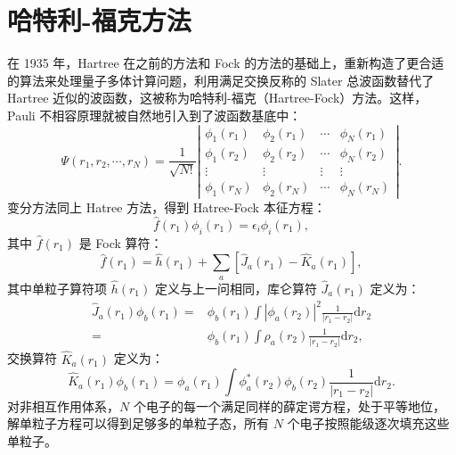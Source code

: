 \section{哈特利-福克方法}
在 1935 年，Hartree 在之前的方法和 Fock 的方法的基础上，重新构造了更合适的算法来处理量子多体计算问题，利用满足交换反称的 Slater 总波函数替代了 Hartree 近似的波函数，这被称为哈特利-福克（Hartree-Fock）方法\cite{Hartree1935}。这样， Pauli 不相容原理就被自然地引入到了波函数基底中：
\begin{equation}
\Psi(r_1,r_2,\cdots,r_N)=\frac{1}{\sqrt{N!}}
\left|
\begin{array}{ccccc} 
    \phi_1(r_1)  &  \phi_2(r_1)   & \cdots & \phi_N(r_1) \\ 
   \phi_1(r_2)  &  \phi_2(r_2)   & \cdots & \phi_N(r_2)\\ 
    \vdots  &  \vdots   &\vdots &\vdots\\
    \phi_1(r_N) &\phi_2(r_N)&\cdots&\phi_N(r_N)
\end{array}
\right| .
\end{equation}
变分方法同上 Hatree 方法，得到 Hatree-Fock 本征方程：
\begin{equation}
\hat{f}(r_1)\phi_i(r_1)=\epsilon_i\phi_i(r_1),
\end{equation}
其中 $\hat{f}(r_1)$ 是 Fock 算符：
\begin{equation}
\hat{f}(r_1)=\hat{h}(r_1)+\sum_{a}\left[\hat{J}_a(r_1)-\hat{K}_a(r_1) \right],
\end{equation}
其中单粒子算符项 $\hat{h}(r_1)$ 定义与上一问相同，库仑算符 $\hat{J}_a(r_1)$ 定义为：
\begin{equation}
\begin{aligned}
\hat{J}_a(r_1)\phi_b(r_1)=&\phi_b(r_1)\int|\phi_a(r_2)|^2\frac{1}{|r_1-r_2|}\mathrm d r_2\\
=&\phi_b(r_1)\int\rho_a(r_2)\frac{1}{|r_1-r_2|}\mathrm d r_2,
\end{aligned}
\end{equation}
交换算符 $\hat{K}_a(r_1)$ 定义为：
\begin{equation}
\hat{K}_a(r_1)\phi_b(r_1)=\phi_a(r_1)\int\phi_a^*(r_2)\phi_b(r_2)\frac{1}{|r_1-r_2|}\mathrm{d} r_2.
\end{equation}
对非相互作用体系，$N$ 个电子的每一个满足同样的薛定谔方程，处于平等地位，解单粒子方程可以得到足够多的单粒子态，所有 $N$ 个电子按照能级逐次填充这些单粒子。

